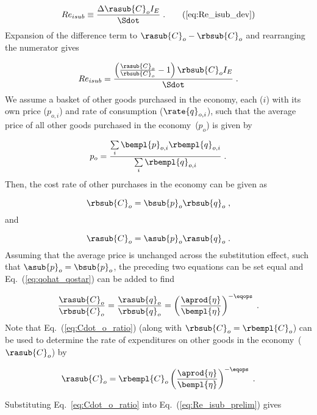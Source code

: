 \begin{equation}
  Re_{isub} \equiv \frac{\Delta \rasub{C}_o I_E}{\Sdot} \; .  \tag{\ref{eq:Re_isub_dev}}
\end{equation}
%
Expansion of the difference term to $\rasub{C}_o - \rbsub{C}_o$ and rearranging the numerator gives

\begin{equation} \label{eq:Re_isub_prelim}
  Re_{isub} = \frac{\left( \frac{\rasub{C}_o}{\rbsub{C}_o} - 1  \right) \rbsub{C}_o I_E} {\Sdot} \; .
\end{equation}
%
We assume a basket of other goods purchased in the economy,
each ($i$) with its own price ($p_{o,i}$) and rate of consumption ($\rate{q}_{o,i}$),
such that the average price of all other goods purchased in the economy~($p_o$) is given by

\begin{equation}
  p_o = \frac{\sum\limits_i \bempl{p}_{o,i} \rbempl{q}_{o,i}}{\sum\limits_i \rbempl{q}_{o,i}} \; .
\end{equation}
%
Then, the cost rate of other purchases in the economy can be given as

\begin{equation}
  \rbsub{C}_o = \bsub{p}_o \rbsub{q}_o \; ,
\end{equation}
%
and

\begin{equation}
  \rasub{C}_o = \asub{p}_o \rasub{q}_o \; .
\end{equation}
%
Assuming that the average price is unchanged across the substitution effect,
such that $\asub{p}_o = \bsub{p}_o$,
the preceding two equations can be set equal and Eq.~(\ref{eq:qohat_qostar}) can be added to find

\begin{equation} \label{eq:Cdot_o_ratio}
  \frac{\rasub{C}_o}{\rbsub{C}_o} 
      = \frac{\rasub{q}_o}{\rbsub{q}_o} 
      = \left( \frac{\aprod{\eta}}{\bempl{\eta}} \right)^{-\eqops}  \; .
\end{equation}
%
Note that Eq.~(\ref{eq:Cdot_o_ratio}) 
(along with $\rbsub{C}_o = \rbempl{C}_o$)
can be used to determine the rate of expenditures 
on other goods in the economy~($\rasub{C}_o$) by

\begin{equation}
  \rasub{C}_o = \rbempl{C}_o \left( \frac{\aprod{\eta}}{\bempl{\eta}} \right)^{-\eqops} \; .
\end{equation}

Substituting Eq.~\ref{eq:Cdot_o_ratio} into Eq.~(\ref{eq:Re_isub_prelim}) gives


